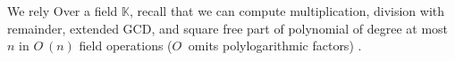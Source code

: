 \documentclass[12pt]{article}
\begin{document}
We rely 
Over a field $\mathbb{K}$, recall that we can compute multiplication,
division with remainder, extended GCD, and square free part of
polynomial of degree at most $n$ in $O^{\tilde{~}}(n)$ field
operations ($O^{\tilde{~}}$ omits polylogarithmic factors)
\cite{GaGe13}.






\end{document}
